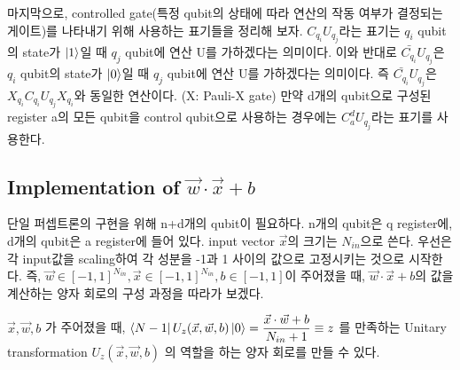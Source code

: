 마지막으로, controlled gate(특정 qubit의 상태에 따라 연산의 작동 여부가 결정되는 게이트)를 나타내기 위해 사용하는 표기들을 정리해 보자. \(C_{q_i}U_{q_j}\)라는 표기는 \(q_i\) qubit의 state가 \(\ket{1}\)일 때 \(q_j\) qubit에 연산 U를 가하겠다는 의미이다.
이와 반대로 \(\bar{C_{q_i}}U_{q_j}\)은 \(q_i\) qubit의 state가 \(\ket{0}\)일 때 \(q_j\) qubit에 연산 U를 가하겠다는 의미이다.
즉 \(\bar{C_{q_i}}U_{q_j}\)은 \(X_{q_i}C_{q_i}U_{q_j}X_{q_i}\)와 동일한 연산이다. (X: Pauli-X gate)
만약 d개의 qubit으로 구성된 register a의 모든 qubit을 control qubit으로 사용하는 경우에는 \(C_a^dU_{q_j}\)라는 표기를 사용한다.

\subsection{Implementation of \(\vec{w}\cdot\vec{x}+b\)}

단일 퍼셉트론의 구현을 위해 n+d개의 qubit이 필요하다. n개의 qubit은 q register에, d개의 qubit은 a register에 들어 있다. input vector \(\vec{x}\)의 크기는 \(N_{in}\)으로 쓴다.
우선은 각 input값을 scaling하여 각 성분을 -1과 1 사이의 값으로 고정시키는 것으로 시작한다.
즉, \(\vec{w} \in [-1,1]^{N_{in}}, \vec{x} \in [-1,1]^{N_{in}}, b \in [-1,1]\)이 주어졌을 때, \(\vec{w}\cdot\vec{x}+b\)의 값을 계산하는 양자 회로의 구성 과정을 따라가 보겠다.

\begin{lemma}
    \(\vec{x}, \vec{w}, b\) 가 주어졌을 때, \(\displaystyle \bra{N-1}U_z(\vec{x},\vec{w},b)\ket{0} = \frac{\vec{x}\cdot \vec{w}+b}{N_{in}+1} \equiv z\) 를 만족하는 Unitary transformation \(U_z(\vec{x},\vec{w},b)\) 의 역할을 하는 양자 회로를 만들 수 있다.
\end{lemma}

